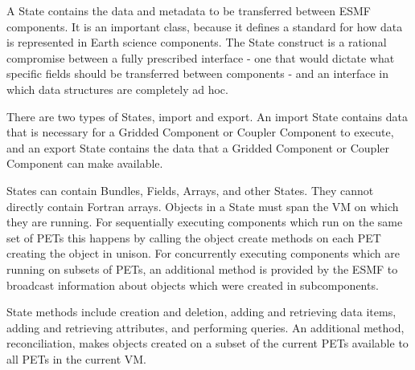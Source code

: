 %


A State contains the data and metadata to be transferred between 
ESMF components.  It is an important class, because it defines a 
standard for how data is represented in Earth science components.  The 
State construct is a rational compromise between a fully prescribed 
interface - one that would dictate what specific fields should be 
transferred between components - and an interface in which data structures
are completely ad hoc.

There are two types of States, import and export.
An import State contains data that is necessary for a Gridded Component
or Coupler Component to execute, and an export State contains the data
that a Gridded Component or Coupler Component can make available.

States can contain Bundles, Fields, Arrays, and other States.  They
cannot directly contain Fortran arrays.   Objects in a State must span
the VM on which they are running.  For sequentially executing components
which run on the same set of PETs this happens by calling the object
create methods on each PET creating the object in unison.   For
concurrently executing components which are running on subsets of PETs,
an additional method is provided by the ESMF to broadcast information
about objects which were created in subcomponents.

State methods include creation and deletion, adding and retrieving 
data items, adding and retrieving attributes, and performing queries.  
An additional method, reconciliation, makes objects created on a subset
of the current PETs available to all PETs in the current VM.

